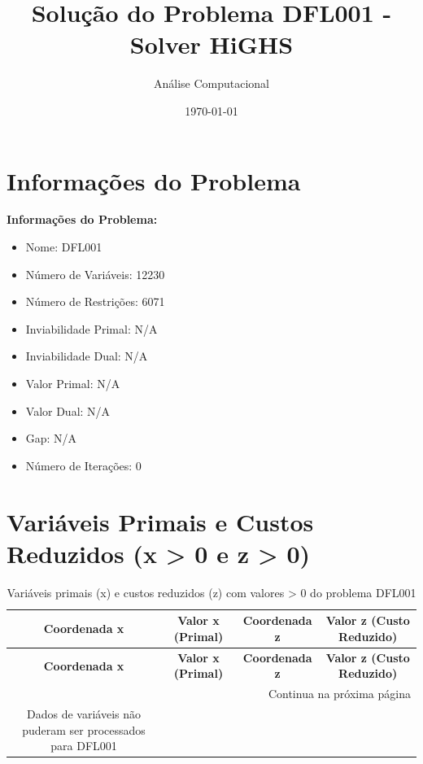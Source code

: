 \documentclass[12pt]{article}
\title{Solução do Problema DFL001 - Solver HiGHS}
\author{Análise Computacional}
\date{\today}
\begin{document}
\maketitle

\section{Informações do Problema}

\textbf{Informações do Problema:}
\begin{itemize}
\item Nome: DFL001
\item Número de Variáveis: 12230
\item Número de Restrições: 6071
\item Inviabilidade Primal: N/A
\item Inviabilidade Dual: N/A
\item Valor Primal: N/A
\item Valor Dual: N/A
\item Gap: N/A
\item Número de Iterações: 0
\end{itemize}


\section{Variáveis Primais e Custos Reduzidos (x > 0 e z > 0)}

\begin{longtable}{@{}cccc@{}}
\caption{Variáveis primais (x) e custos reduzidos (z) com valores > 0 do problema DFL001} \\
\toprule
\textbf{Coordenada x} & \textbf{Valor x (Primal)} & \textbf{Coordenada z} & \textbf{Valor z (Custo Reduzido)} \\
\midrule
\endfirsthead

\toprule
\textbf{Coordenada x} & \textbf{Valor x (Primal)} & \textbf{Coordenada z} & \textbf{Valor z (Custo Reduzido)} \\
\midrule
\endhead

\midrule \multicolumn{4}{r}{{Continua na próxima página}} \\ \midrule
\endfoot

\bottomrule
\endlastfoot
Dados de variáveis não puderam ser processados para DFL001 \\

\bottomrule
\end{longtable}
\end{document}
